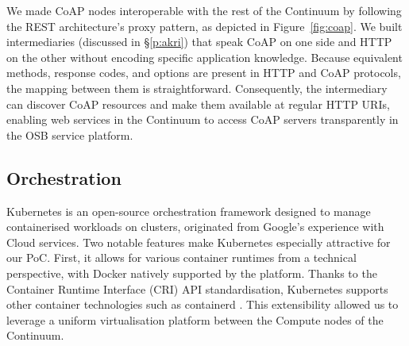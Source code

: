 
We made CoAP nodes interoperable with the rest of the Continuum by following the REST architecture's proxy pattern, as depicted in Figure~\ref{fig:coap}. We built intermediaries (discussed in §\ref{p:akri}) that speak CoAP on one side and HTTP on the other without encoding specific application knowledge. Because equivalent methods, response codes, and options are present in HTTP and CoAP protocols, the mapping between them is straightforward. Consequently, the intermediary can discover CoAP resources and make them available at regular HTTP URIs, enabling web services in the Continuum to access CoAP servers transparently in the OSB service platform.


\subsection{Orchestration}

Kubernetes \cite{kubernetes} is an open-source orchestration framework designed to manage containerised workloads on clusters, originated from Google's experience with Cloud services. Two notable features make Kubernetes especially attractive for our PoC. 
First, it allows for various container runtimes from a technical perspective, with Docker natively supported by the platform. Thanks to the Container Runtime Interface (CRI) API standardisation, Kubernetes supports other container technologies such as containerd \cite{containerd}. This extensibility allowed us to leverage a uniform virtualisation platform between the Compute nodes of the Continuum.

